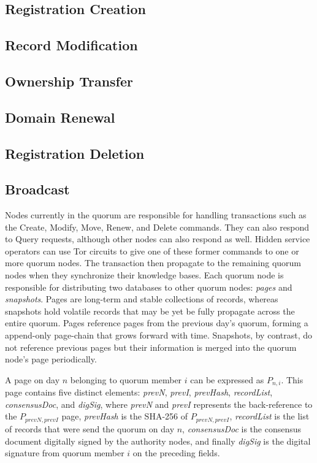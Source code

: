 \subsection{Registration Creation}

\subsection{Record Modification}

\subsection{Ownership Transfer}

\subsection{Domain Renewal}

\subsection{Registration Deletion}

\subsection{Broadcast}






Nodes currently in the quorum are responsible for handling transactions such as the Create, Modify, Move, Renew, and Delete commands. They can also respond to Query requests, although other nodes can also respond as well. Hidden service operators can use Tor circuits to give one of these former commands to one or more quorum nodes. The transaction then propagate to the remaining quorum nodes when they synchronize their knowledge bases. Each quorum node is responsible for distributing two databases to other quorum nodes: \textit{pages} and \textit{snapshots}. Pages are long-term and stable collections of records, whereas snapshots hold volatile records that may be yet be fully propagate across the entire quorum. Pages reference pages from the previous day's quorum, forming a append-only page-chain that grows forward with time. Snapshots, by contrast, do not reference previous pages but their information is merged into the quorum node's page periodically.




A page on day $ n $ belonging to quorum member $ i $ can be expressed as $ P_{n,i} $. This page contains five distinct elements: \textit{prevN}, \textit{prevI}, \textit{prevHash}, \textit{recordList}, \textit{consensusDoc}, and \textit{digSig}, where \textit{prevN} and \textit{prevI} represents the back-reference to the $ P_{prevN,prevI} $ page, \textit{prevHash} is the SHA-256 of $ P_{prevN,prevI} $, \textit{recordList} is the list of records that were send the quorum on day $ n $, \textit{consensusDoc} is the consensus document digitally signed by the authority nodes, and finally \textit{digSig} is the digital signature from quorum member $ i $ on the preceding fields.

